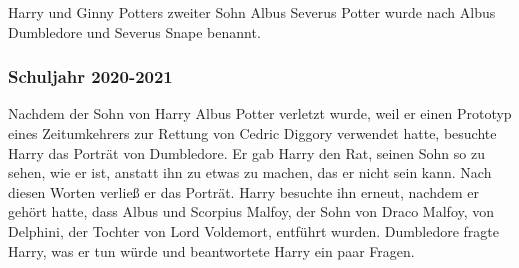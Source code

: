 \documentclass[a4paper, 10pt]{article}
\begin{document}
\vspace{10pt}
\newline
{}  
Harry und Ginny Potters zweiter Sohn Albus Severus Potter wurde nach Albus Dumbledore und Severus Snape benannt.
\subsubsection*{Schuljahr 2020-2021}
Nachdem der Sohn von Harry Albus Potter verletzt wurde, weil er einen Prototyp eines Zeitumkehrers zur Rettung von Cedric Diggory verwendet hatte, besuchte Harry das Porträt von Dumbledore. Er gab Harry den Rat, seinen Sohn so zu sehen, wie er ist, anstatt ihn zu etwas zu machen, das er nicht sein kann. Nach diesen Worten verließ er das Porträt.
\vspace{10pt}
\newline
{}  
Harry besuchte ihn erneut, nachdem er gehört hatte, dass Albus und Scorpius Malfoy, der Sohn von Draco Malfoy, von Delphini, der Tochter von Lord Voldemort, entführt wurden. Dumbledore fragte Harry, was er tun würde und beantwortete Harry ein paar Fragen.
\end{document}
